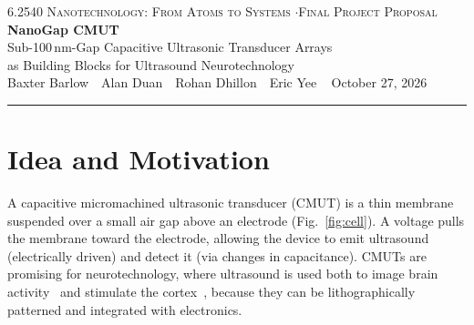 \documentclass[9pt]{extarticle}
\newcommand{\members}{Baxter Barlow \,\textperiodcentered\, Alan Duan \,\textperiodcentered\, Rohan Dhillon \,\textperiodcentered\, Eric Yee}
\begin{document}
\begin{center}
  {\footnotesize\scshape 6.2540 Nanotechnology: From Atoms to Systems \quad$\cdot$\quad Final Project Proposal}\\[3pt]
  {\LARGE\bfseries NanoGap CMUT}\\[2.5pt]
  {\large Sub-100\,nm-Gap Capacitive Ultrasonic Transducer Arrays\\[0.5pt]
    as Building Blocks for Ultrasound Neurotechnology}\\[3.5pt]
  \members\ \,\textperiodcentered\, {October 27, 2026}\\[-3pt]
  \rule{\textwidth}{0.4pt}
\end{center}
\vspace{-11pt}

\section{Idea and Motivation}

A capacitive micromachined ultrasonic transducer (CMUT) is a thin membrane suspended over a small air gap above an electrode (Fig.~\ref{fig:cell}). A voltage pulls the membrane toward the electrode, allowing the device to emit ultrasound (electrically driven) and detect it (via changes in capacitance). CMUTs are promising for neurotechnology, where ultrasound is used both to image brain activity~\cite{griggs2024} and stimulate the cortex~\cite{legon2014}, because they can be lithographically patterned and integrated with electronics.
\end{document}
